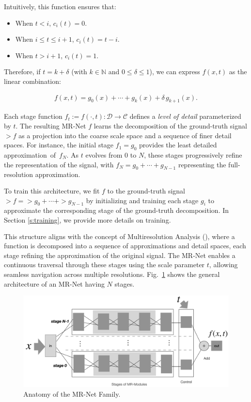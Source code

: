Intuitively, this function ensures that:

\begin{itemize}
    \item When \( t < i \), \( c_i(t) = 0 \).
    \item When \( i \leq t \leq i+1 \), \( c_i(t) = t - i \).
    \item When \( t > i + 1 \), \( c_i(t) = 1 \).
\end{itemize}

Therefore, if \( t = k + \delta \) (with \( k \in \mathbb{N} \) and \( 0 \leq \delta \leq 1 \)), we can express \( f(x, t) \) as the linear combination:

\begin{align}
f(x, t) = g_0(x) + \cdots + g_k(x) + \delta \, g_{k+1}(x).
\end{align}

Each stage function \( f_t := f(\cdot, t) : \mathcal{D} \to \mathcal{C} \) defines a \textit{level of detail} parameterized by \( t \). The resulting MR-Net $f$ learns the decomposition of the ground-truth signal $\gt{f}$ as a projection into the coarse scale space and a sequence of finer detail spaces. For instance, the initial stage $f_1=g_0$ provides the least detailed approximation~of~$f_N$. As \( t \) evolves from 0 to \( N \), these stages progressively refine the representation of the signal, with \( f_N = g_0 + \cdots + g_{N-1} \) representing the full-resolution approximation.

To train this architecture, we fit \( f \) to the ground-truth signal \( \gt{f} = \gt{g}_0 + \cdots + \gt{g}_{N-1} \) by initializing and training each stage \( g_i \) to approximate the corresponding stage of the ground-truth decomposition. In Section \ref{s:training}, we provide more details on training.

This structure aligns with the concept of Multiresolution Analysis (\cite{mallat-mr89}), where a function is decomposed into a sequence of approximations and detail spaces, each stage refining the approximation of the original signal. The MR-Net enables a continuous traversal through these stages using the scale parameter \(t\), allowing seamless navigation across multiple resolutions. Fig.~\ref{f:mrnet-arch} shows the general architecture of an MR-Net having \(N\) stages.

\begin{figure}[!h]
\centering
\includegraphics[width=0.9\linewidth]{img/ch4/mr-net-stages-v2.png}
\caption{Anatomy of the MR-Net Family.}
\label{f:mrnet-arch}
\end{figure}


